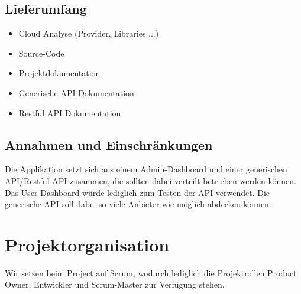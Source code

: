 \subsection{Lieferumfang}
\begin{itemize}
  \item Cloud Analyse (Provider, Libraries ...)
  \item Source-Code
  \item Projektdokumentation
  \item Generische API Dokumentation
  \item Restful API Dokumentation
\end{itemize}

\subsection{Annahmen und Einschränkungen}
Die Applikation setzt sich aus einem Admin-Dashboard und einer generischen 
API/Restful API
zusammen, die sollten dabei verteilt betrieben werden können.
Das User-Dashboard würde lediglich zum Testen der API verwendet.
Die generische API soll dabei so viele Anbieter wie möglich abdecken können.
\section{Projektorganisation}
Wir setzen beim Project auf Scrum\autocite{scrum}, wodurch lediglich die Projektrollen Product 
Owner, Entwickler und Scrum-Master zur Verfügung stehen.
